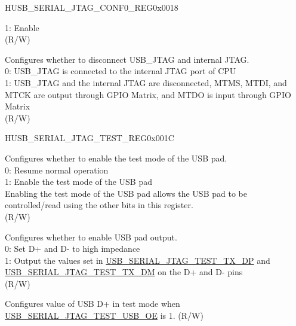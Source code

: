 \begin{register}{H}{USB\_SERIAL\_JTAG\_CONF0\_REG}{0x0018}
\begin{regdesc}
\begin{reglist}
1: Enable\\
(R/W)
\label{fielddesc:USBSERIALJTAGUSBJTAGBRIDGEEN}\item [USB\_SERIAL\_JTAG\_USB\_JTAG\_BRIDGE\_EN] Configures whether to disconnect USB\_JTAG and internal JTAG. \\
0: USB\_JTAG is connected to the internal JTAG port of CPU\\
1: USB\_JTAG and the internal JTAG are disconnected, MTMS, MTDI, and MTCK are output through GPIO Matrix, and MTDO is input through GPIO Matrix\\
(R/W)
\end{reglist}\end{regdesc}
\end{register}


\begin{register}{H}{USB\_SERIAL\_JTAG\_TEST\_REG}{0x001C}\label{regdesc:USBSERIALJTAGTESTREG}
%
%
%
%
%
%
%
%
\regnewline%
\begin{regdesc}\begin{reglist}
\label{fielddesc:USBSERIALJTAGTESTENABLE}\item [USB\_SERIAL\_JTAG\_TEST\_ENABLE] Configures whether to enable the test mode of the USB pad. \\
0: Resume normal operation\\
1: Enable the test mode of the USB pad\\
Enabling the test mode of the USB pad allows the USB pad to be controlled/read using the other bits in this register.\\
(R/W)
\label{fielddesc:USBSERIALJTAGTESTUSBOE}\item [USB\_SERIAL\_JTAG\_TEST\_USB\_OE] Configures whether to enable USB pad output. \\
0: Set D+ and D- to high impedance\\
1: Output the values set in \hyperref[fielddesc:USBSERIALJTAGTESTTXDP]{USB\_SERIAL\_JTAG\_TEST\_TX\_DP} and \hyperref[fielddesc:USBSERIALJTAGTESTTXDM]{USB\_SERIAL\_JTAG\_TEST\_TX\_DM} on the D+ and D- pins\\
(R/W)
\label{fielddesc:USBSERIALJTAGTESTTXDP}\item [USB\_SERIAL\_JTAG\_TEST\_TX\_DP] Configures value of USB D+ in test mode when \hyperref[fielddesc:USBSERIALJTAGTESTUSBOE]{USB\_SERIAL\_JTAG\_TEST\_USB\_OE} is 1. (R/W)

\end{reglist}
\end{regdesc}
\end{register}
